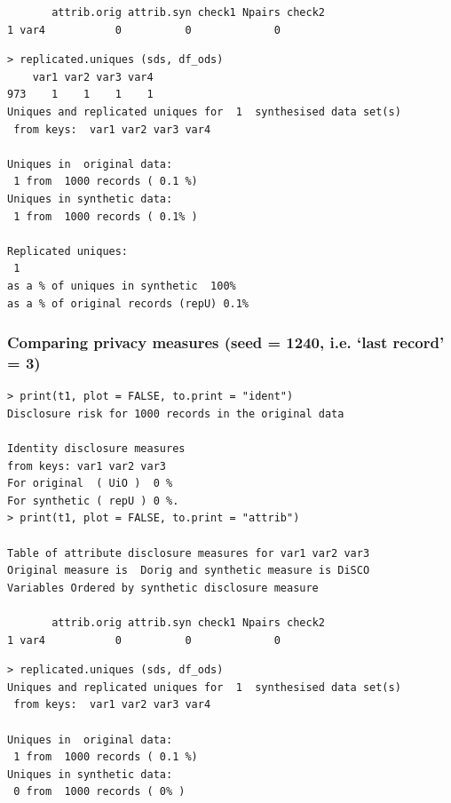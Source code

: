 \documentclass[t,8pt,utfx8]{beamer}
\begin{document}
\begin{spacing}{1.25}
\begin{frame}[fragile]
\begin{minipage}[t]{0.48\textwidth}
\begin{lstlisting}
       attrib.orig attrib.syn check1 Npairs check2
1 var4           0          0             0       
\end{lstlisting}
\end{minipage}%
  \hfill%
\begin{minipage}[t]{0.48\textwidth}
\begin{lstlisting}
> replicated.uniques (sds, df_ods)
    var1 var2 var3 var4
973    1    1    1    1
Uniques and replicated uniques for  1  synthesised data set(s)
 from keys:  var1 var2 var3 var4 

Uniques in  original data:
 1 from  1000 records ( 0.1 %) 
Uniques in synthetic data:
 1 from  1000 records ( 0.1% )

Replicated uniques:
 1
as a % of uniques in synthetic  100%
as a % of original records (repU) 0.1%
\end{lstlisting}
\end{minipage}
\end{frame}

\begin{frame}[fragile]
\frametitle{Comparing privacy measures (seed = 1240, i.e. `last record' = 3)}
  


\begin{minipage}[t]{0.48\textwidth}
\begin{lstlisting}
> print(t1, plot = FALSE, to.print = "ident")
Disclosure risk for 1000 records in the original data

Identity disclosure measures
from keys: var1 var2 var3 
For original  ( UiO )  0 %
For synthetic ( repU ) 0 %.
> print(t1, plot = FALSE, to.print = "attrib")

Table of attribute disclosure measures for var1 var2 var3 
Original measure is  Dorig and synthetic measure is DiSCO 
Variables Ordered by synthetic disclosure measure

       attrib.orig attrib.syn check1 Npairs check2
1 var4           0          0             0       
\end{lstlisting}
\end{minipage}%
  \hfill%
\begin{minipage}[t]{0.48\textwidth}
\begin{lstlisting}
> replicated.uniques (sds, df_ods)
Uniques and replicated uniques for  1  synthesised data set(s)
 from keys:  var1 var2 var3 var4 

Uniques in  original data:
 1 from  1000 records ( 0.1 %) 
Uniques in synthetic data:
 0 from  1000 records ( 0% )


\end{lstlisting}
\end{minipage}
\end{frame}
\end{spacing}
\end{document}
